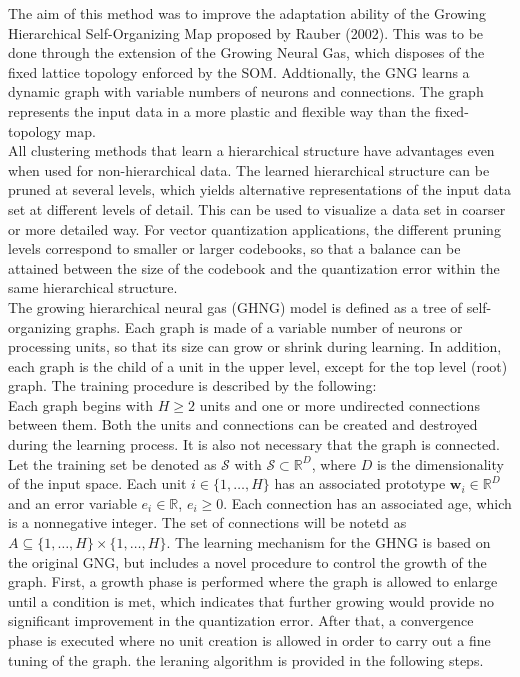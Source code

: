 \documentclass[]{article}
\begin{document}
	\noindent
	The aim of this method was to improve the adaptation ability of the Growing Hierarchical Self-Organizing Map proposed by Rauber (2002).  This was to be done through the extension of the Growing Neural Gas, which disposes of the fixed lattice topology enforced by the SOM.  Addtionally, the GNG learns a dynamic graph with variable numbers of neurons and connections.  The graph represents the input data in a more plastic and flexible way than the fixed-topology map.  	\\
	
	\noindent
	All clustering methods that learn a hierarchical structure have advantages even when used for non-hierarchical data. The learned hierarchical structure can be pruned at several levels, which yields alternative representations of the input data set at different levels of detail. This can be used to visualize a data set in coarser	or more detailed way. For vector quantization applications, the different pruning levels correspond to smaller or larger codebooks, so that a balance can be attained between the size of the codebook and the quantization error within the same hierarchical structure.\\
	
	\noindent
	The growing hierarchical neural gas (GHNG) model is defined as a tree of self-organizing graphs.  Each graph is made of a variable number of neurons or processing units, so that its size can grow or shrink during learning. In addition, each graph is the child of a unit in the upper level, except for the top	level (root) graph.  The training procedure is described by the following: \\
	
	\noindent
	Each graph begins with $H \geq 2$ units and one or more undirected connections between them.  Both the units and connections can be created and destroyed during the learning process. It is also not necessary that the graph is connected.  Let the training set be denoted as $\mathcal{S}$ with $\mathcal{S} \subset \mathbb{R}^{D}$, where $D$ is the dimensionality of the input space.  Each unit $i\in \{1, \dots, H \}$ has an associated prototype $\bm{w}_{i} \in \mathbb{R}^{D}$ and an error variable $e_i \in \mathbb{R}$, $e_i \geq 0$.  Each connection has an associated age, which is a nonnegative integer.  The set of connections will be notetd as $A \subseteq \{1, \dots,H \} \times \{1, \dots, H \}$.  The learning mechanism for the GHNG is based on the original GNG, but includes a novel procedure to control the growth of the graph.  First, a growth phase is performed where the graph is allowed to enlarge until a condition is met, which indicates that further growing would provide no significant improvement in the quantization error.  After that, a convergence phase is executed where no unit creation is allowed in order to carry out a fine tuning of the graph.  the leraning algorithm is provided in the following steps. \\
	
\end{document}
